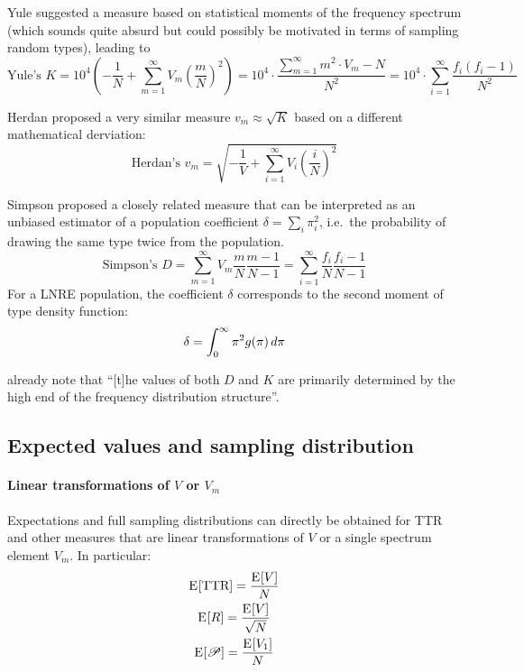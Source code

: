 \documentclass[a4paper]{article}
\begin{document}
Yule suggested a measure based on statistical moments of the frequency
spectrum (which sounds quite absurd but could possibly be motivated in
terms of sampling random types), leading to
\begin{equation}
  \label{eq:prod:yule-K}
  \text{Yule's } K = 
  10^4 \left(-\frac1N + \sum_{m=1}^{\infty} V_m \left( \frac{m}{N}\right)^2 \right)
  = 10^4 \cdot \frac{\sum_{m=1}^{\infty} m^2\cdot V_m - N}{N^2}
  = 10^4 \cdot \sum_{i=1}^{\infty} \frac{f_i (f_i - 1)}{N^2}
\end{equation}

Herdan proposed a very similar measure $v_m \approx \sqrt{K}$ based on a different
mathematical derviation:
\begin{equation}
  \label{eq:prod:herdan-vm}
  \text{Herdan's } v_m =
  \sqrt{-\frac{1}{V} + \sum_{i=1}^{\infty} V_i \left(\frac{i}{N}\right)^2}
\end{equation}

Simpson proposed a closely related measure that can be interpreted as an
unbiased estimator of a population coefficient
$\delta = \sum_i \pi_i^2$, i.e.\ the probability of drawing the same type
twice from the population.
\begin{equation}
  \label{eq:prod:simpson-D}
  \text{Simpson's } D = \sum_{m=1}^{\infty} V_m \frac{m}{N} \frac{m - 1}{N - 1}
  = \sum_{i=1}^{\infty} \frac{f_i}{N} \frac{f_i-1}{N-1}
\end{equation}
For a LNRE population, the coefficient $\delta$ corresponds to the second
moment of type density function:
\begin{equation}
  \label{eq:prod:tdf-2nd-moment}
  \delta = \int_0^{\infty} \pi^2 g(\pi) \,d\pi
\end{equation}

\citet[124]{Baayen:vanHalteren:Tweedie:96} already note that ``[t]he values of
both $D$ and $K$ are primarily determined by the high end of the frequency
distribution structure''.

\subsection{Expected values and sampling distribution}
\label{sec:prod:expectation}

\paragraph*{Linear transformations of $V$ or $V_m$}
Expectations and full sampling distributions can directly be obtained for TTR
and other measures that are linear transformations of $V$ or a single spectrum
element $V_m$.  In particular:
\begin{gather}
  \mathrm{E}_{}[\text{TTR}] = \frac{\mathrm{E}_{}[V]}{N}\\
  \mathrm{E}_{}[R] = \frac{\mathrm{E}_{}[V]}{\sqrt{N}}\\
  \mathrm{E}_{}[\mathscr{P}] = \frac{\mathrm{E}_{}[V_1]}{N}
\end{gather}
\end{document}
